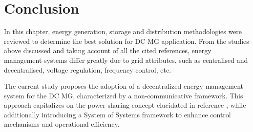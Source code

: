 \section{Conclusion}
In this chapter, energy generation, storage and distribution methodologies were reviewed to determine the best solution for DC MG application. From the studies above discussed and taking account of all the cited references, energy management systems differ greatly due to grid attributes, such as centralised and decentralised, voltage regulation, frequency control, etc.\par 
The current study proposes the adoption of a decentralized energy management system for the DC MG, characterized by a non-communicative framework. This approach capitalizes on the power sharing concept elucidated in reference \cite{Bastos2022}, while additionally introducing a System of Systems framework to enhance control mechanisms and operational efficiency.